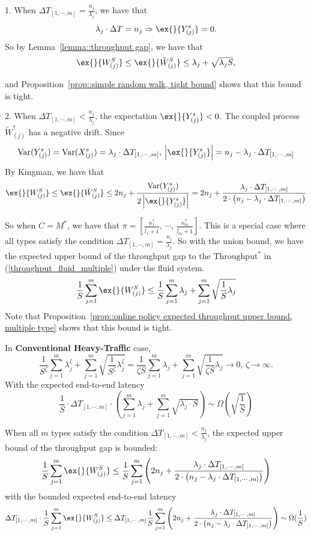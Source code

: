 1. When $ \Delta T_{[1,\cdots,m]} = \frac{n_j}{\lambda_j}$, we have that
$$\lambda_j\cdot \Delta T = n_j\Rightarrow \ex{}{Y^s_{(j)}}=0.$$
So by Lemma~\ref{lemma::throughput gap}, we have that
$$\ex{}{W^S_{(j)}}\leq \ex{}{\tilde{W}^S_{(j)}}\leq \lambda_j + \sqrt{\lambda_j S}, $$

and Proposition~\ref{prop::simple random walk, tight bound} shows that this bound is tight.

2. When $\Delta T_{[1,\cdots,m]} < \frac{n_j}{\lambda_j}$, the expectation $\ex{}{Y^s_{(j)}}<0$. The coupled process $\tilde{W}^s_{(j)}$ has a negative drift. Since
$$\text{Var}(Y^s_{(j)} )= \text{Var}(X^s_{(j)} )  = \lambda_j \cdot \Delta T_{[1,\cdots,m]},\,
\left| \ex{}{Y^s_{(j)}} \right| = n_j - \lambda_j\cdot \Delta T_{[1,\cdots,m]}$$
By Kingman, we have that
$$\ex{}{W^S_{(j)}}\leq \ex{}{\tilde{W}^S_{(j)}}\leq 2n_j + \frac{\text{Var}(Y^s_{(j)} )}{2\left| \ex{}{Y^s_{(j)}} \right| } =2n_j+ \frac{\lambda_j \cdot \Delta T_{[1,\cdots,m]}}{2\cdot\left(n_j - \lambda_j\cdot \Delta T_{[1,\cdots,m]}\right)}$$

So when $C = M^*$, we have that $\pi = [\frac{n_1^*}{l_1^\prime+1},\,\cdots,\, \frac{n_m^*}{l_m^\prime+1}]$. This is a special case where all types satisfy the condition $\Delta T_{[1,\cdots,m]} = \frac{n_j}{\lambda_j}$. So with the union bound, we have the expected upper bound of the throughput gap to the $\text{Throughput}^*$ in (\ref{throughput_fluid_multiple}) under the fluid system.
$$\frac{1}{S}\sum_{j=1}^m \ex{}{W^S_{(j)}}\leq \frac{1}{S}\sum_{j=1}^m \lambda_j +\sum_{j=1}^m \sqrt{\frac{1}{S}\lambda_j} $$
Note that Proposition~\ref{prop::online policy expected throughput upper bound, multiple type} shows that this bound is tight.

In \textbf{Conventional Heavy-Traffic} case,
$$\frac{1}{S^{\zeta }}\sum_{j=1}^m \lambda_j^{\zeta } +\sum_{j=1}^m \sqrt{\frac{1}{S^{\zeta }}\lambda_j^{\zeta }}  =\frac{1}{\zeta S}\sum_{j=1}^m \lambda_j +\sum_{j=1}^m \sqrt{\frac{1}{\zeta S}\lambda_j} \to 0, \,\zeta \to \infty.$$
With the expected end-to-end latency
$$\frac{1}{S}\cdot\Delta T_{[1,\cdots,m]} \cdot \left(\sum_{j=1}^m \lambda_j +\sum_{j=1}^m \sqrt{\lambda_j\cdot S} \right) \sim \Omega(\sqrt{\frac{1}{S}})$$

When all $m$ types satisfy the condition $\Delta T_{[1,\cdots,m]} < \frac{n_j}{\lambda_j}$, the expected upper bound of the throughput gap is bounded:
$$\frac{1}{S}\sum_{j=1}^m \ex{}{W^S_{(j)}}\leq \frac{1}{S}  \sum_{j=1}^m \left(2n_j+ \frac{\lambda_j \cdot \Delta T_{[1,\cdots,m]}}{2\cdot\left(n_j - \lambda_j\cdot \Delta T_{[1,\cdots,m]}\right)}\right) $$
with the bounded expected end-to-end latency
$$ \Delta T_{[1,\cdots,m]} \cdot\frac{1}{S}\sum_{j=1}^m \ex{}{W^S_{(j)}}\leq \Delta T_{[1,\cdots,m]}\frac{1}{S}  \sum_{j=1}^m \left(2n_j+ \frac{\lambda_j \cdot \Delta T_{[1,\cdots,m]}}{2\cdot\left(n_j - \lambda_j\cdot \Delta T_{[1,\cdots,m]}\right)}\right) \sim \Omega(\frac{1}{S})$$

